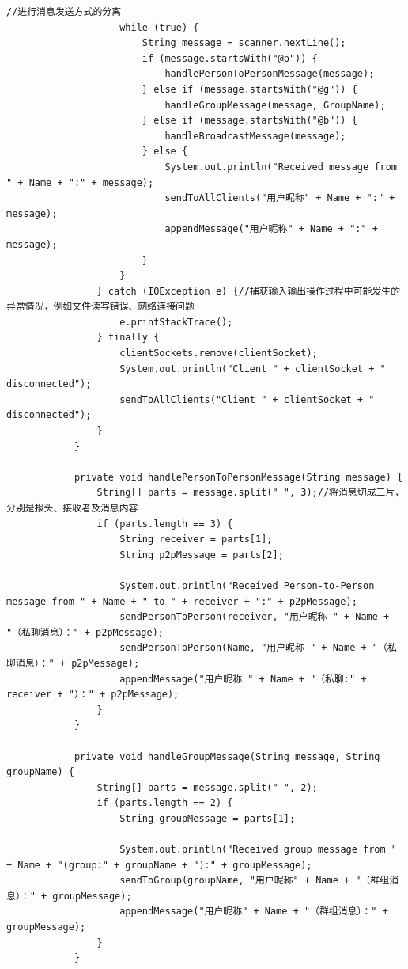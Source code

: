 \documentclass[UTF8,12pt]{article}
\begin{document}
\begin{lstlisting}[title=ChatServer.java源代码,frame=shadowbox]
                    //进行消息发送方式的分离
                    while (true) {
                        String message = scanner.nextLine();
                        if (message.startsWith("@p")) {
                            handlePersonToPersonMessage(message);
                        } else if (message.startsWith("@g")) {
                            handleGroupMessage(message, GroupName);
                        } else if (message.startsWith("@b")) {
                            handleBroadcastMessage(message);
                        } else {
                            System.out.println("Received message from " + Name + ":" + message);
                            sendToAllClients("用户昵称" + Name + ":" + message);
                            appendMessage("用户昵称" + Name + ":" + message);
                        }
                    }
                } catch (IOException e) {//捕获输入输出操作过程中可能发生的异常情况，例如文件读写错误、网络连接问题
                    e.printStackTrace();
                } finally {
                    clientSockets.remove(clientSocket);
                    System.out.println("Client " + clientSocket + " disconnected");
                    sendToAllClients("Client " + clientSocket + " disconnected");
                }
            }
    
            private void handlePersonToPersonMessage(String message) {
                String[] parts = message.split(" ", 3);//将消息切成三片，分别是报头、接收者及消息内容
                if (parts.length == 3) {
                    String receiver = parts[1];
                    String p2pMessage = parts[2];
    
                    System.out.println("Received Person-to-Person message from " + Name + " to " + receiver + ":" + p2pMessage);
                    sendPersonToPerson(receiver, "用户昵称 " + Name + "（私聊消息）：" + p2pMessage);
                    sendPersonToPerson(Name, "用户昵称 " + Name + "（私聊消息）：" + p2pMessage);
                    appendMessage("用户昵称 " + Name + "（私聊:" + receiver + "）：" + p2pMessage);
                }
            }
    
            private void handleGroupMessage(String message, String groupName) {
                String[] parts = message.split(" ", 2);
                if (parts.length == 2) {
                    String groupMessage = parts[1];
    
                    System.out.println("Received group message from " + Name + "(group:" + groupName + "):" + groupMessage);
                    sendToGroup(groupName, "用户昵称" + Name + "（群组消息）：" + groupMessage);
                    appendMessage("用户昵称" + Name + "（群组消息）：" + groupMessage);
                }
            }
    

\end{lstlisting}
\end{document}
